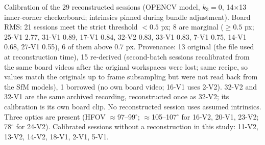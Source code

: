 Calibration of the 29 reconstructed sessions (OPENCV model, $k_3=0$, 14$\times$13 inner-corner checkerboard; intrinsics pinned during bundle adjustment). Board RMS: 21 sessions meet the strict threshold $<0.5$ px; 8 are marginal ($\geq0.5$ px; 25-V1 2.77, 31-V1 0.89, 17-V1 0.84, 32-V2 0.83, 33-V1 0.83, 7-V1 0.75, 14-V1 0.68, 27-V1 0.55), 6 of them above 0.7 px. Provenance: 13 original (the file used at reconstruction time), 15 re-derived (second-batch sessions recalibrated from the same board videos after the original workspaces were lost; same recipe, so values match the originals up to frame subsampling but were not read back from the SfM models), 1 borrowed (no own board video; 16-V1 uses 2-V2). 32-V2 and 32-V1 are the same archived recording, reconstructed once as 32-V2; its calibration is its own board clip. No reconstructed session uses assumed intrinsics. Three optics are present (HFOV $\approx$97--99$^\circ$; $\approx$105--107$^\circ$ for 16-V2, 20-V1, 23-V2; 78$^\circ$ for 24-V2). Calibrated sessions without a reconstruction in this study: 11-V2, 13-V2, 14-V2, 18-V1, 2-V1, 5-V1.
